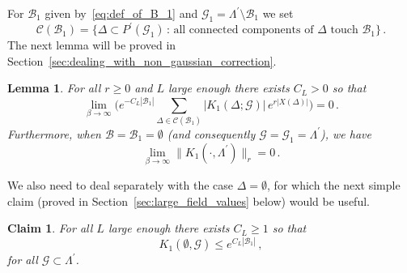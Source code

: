 \documentclass[11pt]{article}
\newtheorem{lemma}[theorem]{Lemma}
\newtheorem{claim}[theorem]{Claim}
\theoremstyle{definition}
\theoremstyle{remark}
\numberwithin{theorem}{section}
\def\La{{\Lambda}}
\begin{document}
    For $\mathcal{B}_1$ given by~\eqref{eq:def_of_B_1} and $\mathcal{G}_1 = \La^\prime \setminus \mathcal{B}_1$ we set
    \begin{equation} \label{eq:def_of_C_B_1}
        \mathcal{C}(\mathcal{B}_1 ) = \big\{\Delta\subset P^\prime(\mathcal{G}_1) \, : \, \text{all connected components of $\Delta$ touch $\mathcal{B}_1$} \big\} \, .
    \end{equation}     
    The next lemma will be proved in Section~\ref{sec:dealing_with_non_gaussian_correction}.
    \begin{lemma}
    \label{lemma:bound_for_the_non_gaussian_weight}
       For all $r\ge 0$ and $L$ large enough there exists $C_L>0$ so that 
       \[
        \lim_{\beta\to\infty} \bigg( e^{-C_L|\mathcal{B}_1|}\sum_{\Delta\in \mathcal{C}(\mathcal{B}_1 ) } |K_1(\Delta;\mathcal{G})| \,  e^{r|X(\Delta)|} \bigg) = 0 \, . 
       \]
       Furthermore, when $\mathcal{B} = \mathcal{B}_1 = \emptyset$ (and consequently $\mathcal{G} = \mathcal{G}_1 = \La^\prime$), we have 
       \[
       \lim_{\beta\to \infty} \|K_1(\cdot,\La^\prime) \|_{r}  = 0 \, .
       \]
    \end{lemma}
    \noindent
    We also need to deal separately with the case $\Delta = \emptyset$, for which the next simple claim (proved in Section~\ref{sec:large_field_values} below) would be useful.
    \begin{claim}
    \label{claim:bound_on_K_1_emptyset}
        For all $L$ large enough there exists $C_L\ge 1$ so that
        \[
        K_1(\emptyset,\mathcal{G}) \le e^{C_L |\mathcal{B}_1|} \, ,
        \]
        for all $\mathcal{G}\subset  \La^\prime$. 
    \end{claim}
\end{document}
